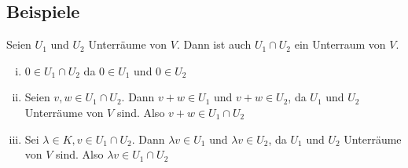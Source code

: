 \subsection{Beispiele} %
\label{sub:beispiele}
Seien $U_1$ und $U_2$ Unterräume von $V$. Dann ist auch $U_1 \cap U_2$ ein Unterraum von $V$.
\begin{enumerate}[(i)]
	\item $0 \in U_1 \cap U_2$ da $ 0 \in U_1$ und $0 \in U_2$
	\item Seien $v,w \in U_1 \cap U_2$. Dann $v+w \in U_1$ und $v+w \in U_2$, da $U_1$ und $U_2$ Unterräume von $V$ 	sind. Also $v+w \in U_1 \cap U_2$
	\item Sei $\lambda \in K, v \in U_1 \cap U_2$. Dann $\lambda v \in U_1$ und $\lambda v \in U_2$, da $U_1$ und $U_2$ Unterräume von $V$ sind. Also $\lambda v \in U_1 \cap U_2$
\end{enumerate}


